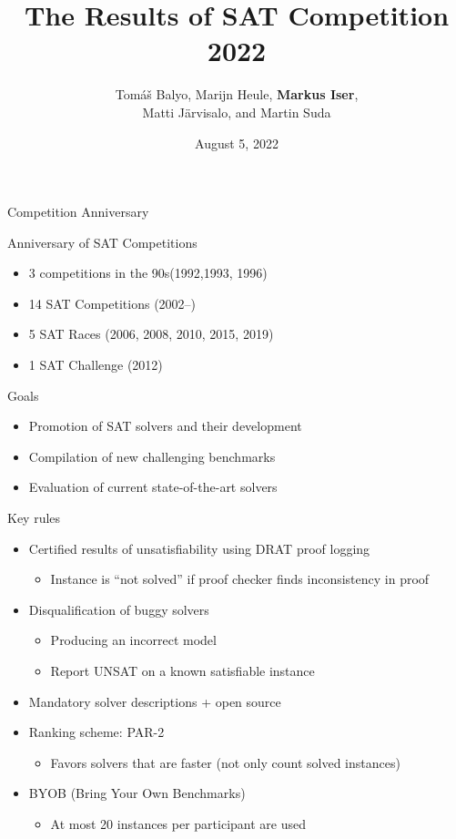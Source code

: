 \documentclass{beamer}
\title[SAT Competition 2022]{The Results of SAT Competition 2022}
\author[Balyo, Heule, Iser, J\"{a}rvisalo, Suda] {Tom{\'a}{\v s} Balyo, Marijn Heule,
{\bf Markus Iser},\\ Matti J\"{a}rvisalo, and Martin Suda}
\institute[] %
{
SAT 2022 Conference, Haifa (Israel) \\ %
}
\date{August 5, 2022} %
\begin{document}
\begin{frame}
\titlepage %
\end{frame}

\begin{frame}{Competition Anniversary}

\begin{block}{Anniversary of SAT Competitions}
\begin{itemize}
\item 3 competitions in the 90s\hfill (1992,1993, 1996)
\item 14 SAT Competitions \hfill (2002--)
\item 5 SAT Races \hfill (2006, 2008, 2010, 2015, 2019)
\item 1 SAT Challenge \hfill (2012)
\end{itemize}
\end{block}

\bigskip

\begin{block}{Goals}
\begin{itemize}
\item Promotion of SAT solvers and their development
\item Compilation of new challenging benchmarks
\item Evaluation of current state-of-the-art solvers
\end{itemize}
\end{block}

\end{frame}


\begin{frame}{Key rules}
\begin{itemize}
\item Certified results of unsatisfiability using DRAT proof logging
  \begin{itemize}
  \item Instance is ``not solved'' if proof checker finds inconsistency in proof
  \end{itemize}
\medskip
\item Disqualification of buggy solvers
  \begin{itemize}
  \item Producing an incorrect model
  \item Report UNSAT on a known satisfiable instance
  \end{itemize}
\medskip
\item Mandatory solver descriptions + open source
\medskip
\item Ranking scheme: PAR-2
\begin{itemize}
\item Favors solvers that are faster (not only count solved instances)
\end{itemize}
\medskip
\item BYOB (Bring Your Own Benchmarks)
\begin{itemize}
\item At most 20 instances per participant are used
\end{itemize} 
\end{itemize}
\end{frame}
\end{document}
